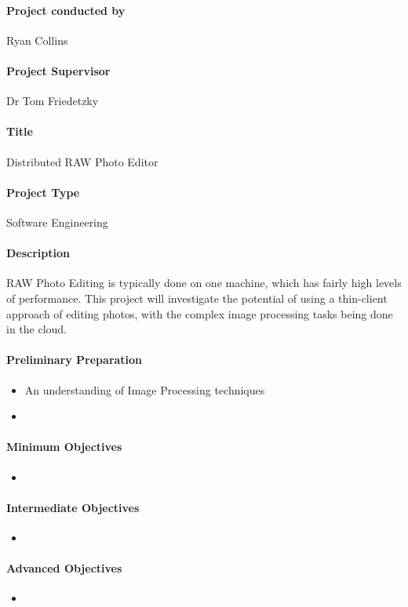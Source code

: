 \documentclass{article}
\begin{document}
    \paragraph{Project conducted by}
        Ryan Collins
    \paragraph{Project Supervisor}
        Dr Tom Friedetzky
    \paragraph{Title}
        Distributed RAW Photo Editor
    \paragraph{Project Type}
        Software Engineering
    \paragraph{Description}
        RAW Photo Editing is typically done on one machine, which has fairly high
        levels of performance. This project will investigate the potential of using
        a thin-client approach of editing photos, with the complex image processing
        tasks being done in the cloud.
    \paragraph{Preliminary Preparation}
        \begin{itemize}
          \item An understanding of Image Processing techniques
          \item
        \end{itemize}
    \paragraph{Minimum Objectives}
        \begin{itemize}
          \item
        \end{itemize}
    \paragraph{Intermediate Objectives}
        \begin{itemize}
          \item
        \end{itemize}
    \paragraph{Advanced Objectives}
        \begin{itemize}
          \item
        \end{itemize}
\end{document}
